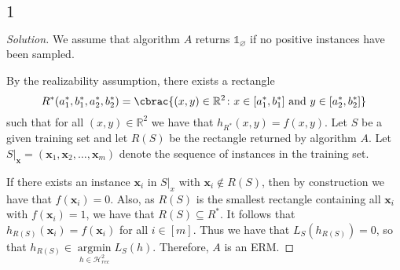 \documentclass[10pt, a4paper, twoside]{amsart}
\newcommand{\R}{\ensuremath{\mathbb{R}}}
\DeclarePairedDelimiter\cbrac\{\}
\renewcommand{\c}{\ensuremath{\colon}}
\newcommand{\se}{\ensuremath{\subseteq}}
\newcommand{\Ind}{\ensuremath{\mathbb{1}}}
\newcommand{\argmin}{\operatorname*{argmin}}
\newenvironment{solution}
               {\let\oldqedsymbol=\qedsymbol
                \renewcommand{\qedsymbol}{$\blacktriangleleft$}
                \begin{proof}[Solution]}
               {\end{proof}
                \renewcommand{\qedsymbol}{\oldqedsymbol}}
\begin{document}
\subsection*{$1$}
\begin{solution}
We assume that algorithm $A$ returns $\Ind_{\varnothing}$ if no positive instances have been sampled.

By the realizability assumption, there exists a rectangle 
\begin{equation*}
R^*(a_1^*,b_1^*,a_2^*,b_2^*)=\cbrac{(x,y)\in \R^2 \c x \in [a_1^*,b_1^*] \text{ and }y \in [a_2^*, b_2^*]}
\end{equation*}
such that for all $(x, y) \in \R^2$ we have that
$h_{R^*}(x, y)=f(x, y)$. Let $S$ be a given training set and let $R(S)$ be the rectangle returned by algorithm $A$. 
Let $S|_{\mathbf{x}}=(\mathbf{x}_1, \mathbf{x}_2, \ldots, \mathbf{x}_m)$ denote the sequence of instances in the training set.

If there exists an instance $\mathbf{x}_i$ in $S|_{x}$ with $\mathbf{x}_i \notin R(S)$, 
then by construction we have that $f(\mathbf{x}_i)=0$.
Also, as $R(S)$ is the smallest rectangle containing all $\mathbf{x}_i$ with $f(\mathbf{x}_i)=1$,
we have that $R(S)\se R^*$. It follows that $h_{R(S)}(\mathbf{x}_i)=f(\mathbf{x}_i)$ for all $i \in [m]$.
Thus we have that $L_S(h_{R(S)})=0$, so that $h_{R(S)} \in \argmin\limits_{h \in \mathcal{H}^2_{rec}}L_S(h)$.
Therefore, $A$ is an ERM.
\end{solution}
\end{document}
